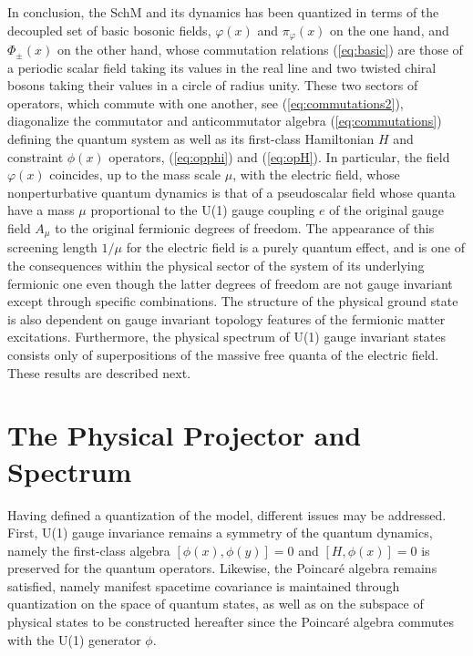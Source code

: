 \documentclass[a4paper,11pt]{article}
\begin{document}
In conclusion, the SchM and its dynamics has been quantized in terms of 
the decoupled set of basic bosonic fields, $\varphi(x)$ and $\pi_\varphi(x)$
on the one hand, and $\Phi_\pm(x)$ on the other hand, whose commutation 
relations (\ref{eq:basic}) are those of a periodic scalar field 
taking its values in the real line and two twisted chiral bosons 
taking their values in a circle of radius unity. These two sectors of 
operators, which commute with one another, see (\ref{eq:commutations2}), 
diagonalize the commutator and anticommutator algebra (\ref{eq:commutations}) 
defining the quantum system as well as its first-class Hamiltonian $H$ and 
constraint $\phi(x)$ operators, (\ref{eq:opphi}) and (\ref{eq:opH}). In 
particular, the field $\varphi(x)$ coincides, up to the mass scale $\mu$, 
with the electric field, whose nonperturbative quantum dynamics 
is that of a pseudoscalar field whose quanta have a mass $\mu$ proportional 
to the U(1) gauge coupling $e$ of the original gauge field $A_\mu$ to
the original fermionic degrees of freedom. The appearance of this screening 
length $1/\mu$ for the electric field is a purely quantum effect, and is 
one of the consequences within the physical sector of the system of its 
underlying fermionic one even though the latter degrees of freedom are
not gauge invariant except through specific combinations. The structure of 
the physical ground state is also dependent on gauge invariant topology 
features of the fermionic matter excitations. Furthermore, the phy\-si\-cal 
spectrum of U(1) gauge invariant states consists only of superpositions of the 
massive free quanta of the electric field. These results are described next.


\section{The Physical Projector and Spectrum}
\label{Sect5}

Having defined a quantization of the model, different issues may be
addressed. First, U(1) gauge invariance remains a symmetry of the quantum
dynamics, namely the first-class algebra $[\phi(x),\phi(y)]=0$ and
$[H,\phi(x)]=0$ is preserved for the quantum operators. Likewise,
the Poincar\'e algebra remains satisfied,\cite{Gaby} namely manifest spacetime
covariance is maintained through quantization on the space of quantum states,
as well as on the subspace of physical states to be constructed hereafter
since the Poincar\'e algebra commutes with the U(1) generator $\phi$.
\end{document}

